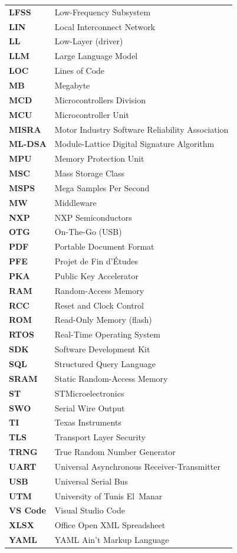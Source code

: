 \begin{tabular}{l l}

\textbf{LFSS} & Low-Frequency Subsystem \\
\textbf{LIN} & Local Interconnect Network \\
\textbf{LL} & Low-Layer (driver) \\
\textbf{LLM} & Large Language Model \\
\textbf{LOC} & Lines of Code \\
\textbf{MB} & Megabyte \\
\textbf{MCD} & Microcontrollers Division \\
\textbf{MCU} & Microcontroller Unit \\
\textbf{MISRA} & Motor Industry Software Reliability Association \\
\textbf{ML-DSA} & Module-Lattice Digital Signature Algorithm \\
\textbf{MPU} & Memory Protection Unit \\
\textbf{MSC} & Mass Storage Class \\
\textbf{MSPS} & Mega Samples Per Second \\
\textbf{MW} & Middleware \\
\textbf{NXP} & NXP Semiconductors \\
\textbf{OTG} & On-The-Go (USB) \\
\textbf{PDF} & Portable Document Format \\
\textbf{PFE} & Projet de Fin d'\'Etudes \\
\textbf{PKA} & Public Key Accelerator \\
\textbf{RAM} & Random-Access Memory \\
\textbf{RCC} & Reset and Clock Control \\
\textbf{ROM} & Read-Only Memory (flash) \\
\textbf{RTOS} & Real-Time Operating System \\
\textbf{SDK} & Software Development Kit \\
\textbf{SQL} & Structured Query Language \\
\textbf{SRAM} & Static Random-Access Memory \\
\textbf{ST} & STMicroelectronics \\
\textbf{SWO} & Serial Wire Output \\
\textbf{TI} & Texas Instruments \\
\textbf{TLS} & Transport Layer Security \\
\textbf{TRNG} & True Random Number Generator \\
\textbf{UART} & Universal Asynchronous Receiver-Transmitter \\
\textbf{USB} & Universal Serial Bus \\
\textbf{UTM} & University of Tunis El~Manar \\
\textbf{VS Code} & Visual Studio Code \\
\textbf{XLSX} & Office Open XML Spreadsheet \\
\textbf{YAML} & YAML Ain't Markup Language \\

\end{tabular}